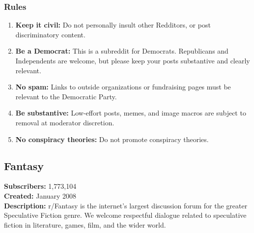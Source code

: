 \subsubsection{Rules}
\begin{enumerate}
    \item \textbf{Keep it civil:} Do not personally insult other Redditors, or post discriminatory content.
    
    \item \textbf{Be a Democrat:} This is a subreddit for Democrats. Republicans and Independents are welcome, but please keep your posts substantive and clearly relevant.
    
    \item \textbf{No spam:} Links to outside organizations or fundraising pages must be relevant to the Democratic Party.
    
    \item \textbf{Be substantive:} Low-effort posts, memes, and image macros are subject to removal at moderator discretion.
    
    \item \textbf{No conspiracy theories:} Do not promote conspiracy theories.
\end{enumerate}

\subsection{Fantasy}
\textbf{Subscribers:} 1,773,104 \\
\textbf{Created:} January 2008 \\
\textbf{Description:} r/Fantasy is the internet's largest discussion forum for the greater Speculative Fiction genre. We welcome respectful dialogue related to speculative fiction in literature, games, film, and the wider world.

